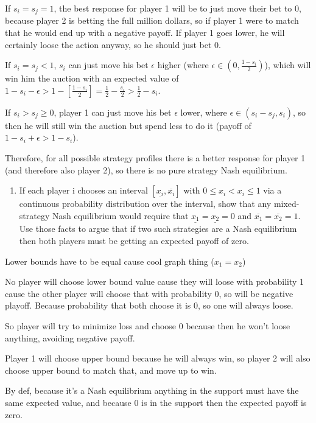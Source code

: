\documentclass{article}
\begin{document}
\begin{enumerate}
          If $s_i = s_j = 1$, the best response for player 1 will be to just move their bet to 0, because player 2 is betting the full million dollars, so if player 1 were to match that he would end up with a negative payoff. If player 1 goes lower, he will certainly loose the action anyway, so he should just bet 0.

          If $s_i = s_j < 1$, $s_i$ can just move his bet $\epsilon$ higher (where $\epsilon \in (0, \frac{1 - s_i}{2})$), which will win him the auction with an expected value of $1 - s_i - \epsilon > 1 - [\frac{1 - s_i}{2}] = \frac{1}{2} - \frac{s_i}{2} > \frac{1}{2} - s_i$.

          If $s_i > s_j \geq 0$, player 1 can just move his bet $\epsilon$ lower, where $\epsilon \in (s_i - s_j, s_i)$, so then he will still win the auction but spend less to do it (payoff of $1 - s_i + \epsilon > 1 - s_i$).

          Therefore, for all possible strategy profiles there is a better response for player 1 (and therefore also player 2), so there is no pure strategy Nash equilibrium.

          \begin{enumerate}[resume]
              \item If each player i chooses an interval $[\underline{x_i}, \overline{x_i}]$ with $0 \leq x_i < x_i \leq 1$ via a continuous probability distribution over the interval, show that any mixed-strategy Nash equilibrium would require that $\underline{x_1} = \underline{x_2} = 0$ and $\overline{x_1} = \overline{x_2} = 1$. Use those facts to argue that if two such strategies are a Nash equilibrium then both players must be getting an expected payoff of zero.
          \end{enumerate}

          Lower bounds have to be equal cause cool graph thing ($x_1 = x_2$)

          No player will choose lower bound value cause they will loose with probability 1 cause the other player will choose that with probability 0, so will be negative playoff. Because probability that both choose it is 0, so one will always loose.

          So player will try to minimize loss and choose 0 because then he won't loose anything, avoiding negative payoff.

          Player 1 will choose upper bound because he will always win, so player 2 will also choose upper bound to match that, and move up to win.

          By def, because it's a Nash equilibrium anything in the support must have the same expected value, and because 0 is in the support then the expected payoff is zero.
\end{enumerate}
\end{document}
